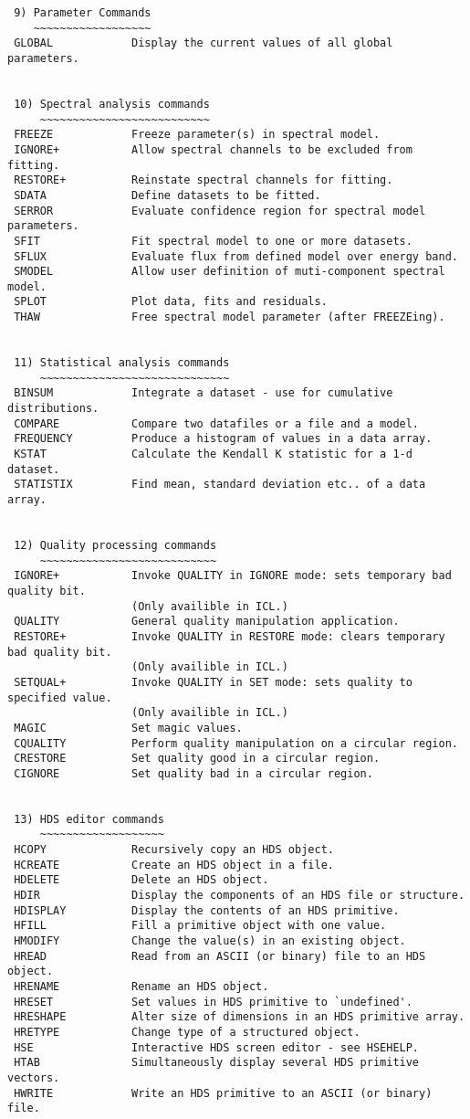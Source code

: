 \begin{verbatim}
 9) Parameter Commands
    ~~~~~~~~~~~~~~~~~~
 GLOBAL            Display the current values of all global parameters.


 10) Spectral analysis commands
     ~~~~~~~~~~~~~~~~~~~~~~~~~~
 FREEZE            Freeze parameter(s) in spectral model.
 IGNORE+           Allow spectral channels to be excluded from fitting.
 RESTORE+          Reinstate spectral channels for fitting.
 SDATA             Define datasets to be fitted.
 SERROR            Evaluate confidence region for spectral model parameters.
 SFIT              Fit spectral model to one or more datasets.
 SFLUX             Evaluate flux from defined model over energy band.
 SMODEL            Allow user definition of muti-component spectral model.
 SPLOT             Plot data, fits and residuals.
 THAW              Free spectral model parameter (after FREEZEing).


 11) Statistical analysis commands
     ~~~~~~~~~~~~~~~~~~~~~~~~~~~~~
 BINSUM            Integrate a dataset - use for cumulative distributions.
 COMPARE           Compare two datafiles or a file and a model.
 FREQUENCY         Produce a histogram of values in a data array.
 KSTAT             Calculate the Kendall K statistic for a 1-d dataset.
 STATISTIX         Find mean, standard deviation etc.. of a data array.


 12) Quality processing commands
     ~~~~~~~~~~~~~~~~~~~~~~~~~~~
 IGNORE+           Invoke QUALITY in IGNORE mode: sets temporary bad quality bit.
                   (Only availible in ICL.)
 QUALITY           General quality manipulation application.
 RESTORE+          Invoke QUALITY in RESTORE mode: clears temporary bad quality bit.
                   (Only availible in ICL.)
 SETQUAL+          Invoke QUALITY in SET mode: sets quality to specified value.
                   (Only availible in ICL.)
 MAGIC             Set magic values.
 CQUALITY          Perform quality manipulation on a circular region.
 CRESTORE          Set quality good in a circular region.
 CIGNORE           Set quality bad in a circular region.


 13) HDS editor commands
     ~~~~~~~~~~~~~~~~~~~
 HCOPY             Recursively copy an HDS object.
 HCREATE           Create an HDS object in a file.
 HDELETE           Delete an HDS object.
 HDIR              Display the components of an HDS file or structure.
 HDISPLAY          Display the contents of an HDS primitive.
 HFILL             Fill a primitive object with one value.
 HMODIFY           Change the value(s) in an existing object.
 HREAD             Read from an ASCII (or binary) file to an HDS object.
 HRENAME           Rename an HDS object.
 HRESET            Set values in HDS primitive to `undefined'.
 HRESHAPE          Alter size of dimensions in an HDS primitive array.
 HRETYPE           Change type of a structured object.
 HSE               Interactive HDS screen editor - see HSEHELP.
 HTAB              Simultaneously display several HDS primitive vectors.
 HWRITE            Write an HDS primitive to an ASCII (or binary) file.



\end{verbatim}
